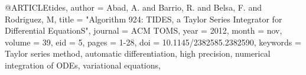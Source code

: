 
@ARTICLE{tides,
   author = {{Abad}, A. and {Barrio}, R. and {Belsa}, F. and {Rodriguez}, M},
    title = "{Algorithm 924: TIDES, a Taylor Series Integrator for Differential EquationS}",
  journal = {ACM TOMS},
     year = 2012,
    month = nov,
   volume = 39,
      eid = {5},
    pages = {1-28},
      doi = {10.1145/2382585.2382590},
 keywords = {Taylor series method, automatic differentiation, high precision, numerical integration of ODEs, variational equations},
}
